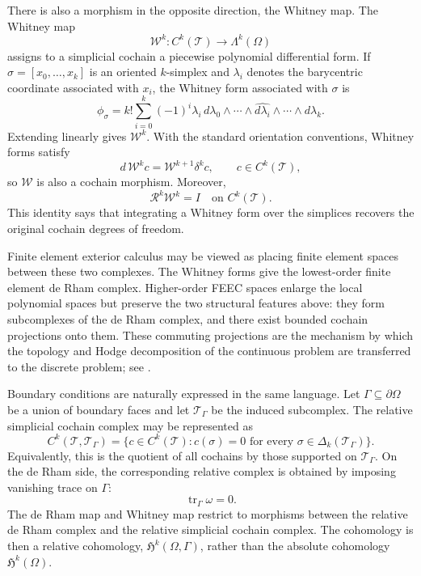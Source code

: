 \documentclass{article}
\newcommand{\f}[1]{\mathfrak{#1}}
\newcommand{\e}[1]{\mathcal{#1}}
\begin{document}
There is also a morphism in the opposite direction, the Whitney map.  The
Whitney map
\[
\e W^k:C^k(\e T)\longrightarrow \Lambda^k(\Omega)
\]
assigns to a simplicial cochain a piecewise polynomial differential form.  If
$\sigma=[x_0,\ldots,x_k]$ is an oriented $k$-simplex and
$\lambda_i$ denotes the barycentric coordinate associated with $x_i$, the
Whitney form associated with $\sigma$ is
\[
\phi_\sigma
	=
	k!
	\sum_{i=0}^k
	(-1)^i
	\lambda_i\,
	d\lambda_0\wedge\cdots
	\wedge \widehat{d\lambda_i}
	\wedge\cdots
	\wedge d\lambda_k.
\]
Extending linearly gives $\e W^k$.  With the standard orientation conventions,
Whitney forms satisfy
\[	d\,\e W^k c
	=
	\e W^{k+1}\delta^k c,
	\qquad
	c\in C^k(\e T),
\]
so $\e W$ is also a cochain morphism.  Moreover,
\[
\e R^k \e W^k = I
	\quad\text{on } C^k(\e T).
\]
This identity says that integrating a Whitney form over the simplices recovers
the original cochain degrees of freedom.

Finite element exterior calculus may be viewed as placing finite element spaces
between these two complexes.  The Whitney forms give the lowest-order finite
element de Rham complex.  Higher-order FEEC spaces enlarge the local polynomial
spaces but preserve the two structural features above: they form subcomplexes of
the de Rham complex, and there exist bounded cochain projections onto them.
These commuting projections are the mechanism by which the topology and Hodge
decomposition of the continuous problem are transferred to the discrete problem;
see \cite{arnold2010finite}.

Boundary conditions are naturally expressed in the same language.  Let
$\Gamma\subseteq \partial\Omega$ be a union of boundary faces and let
$\e T_\Gamma$ be the induced subcomplex.  The relative simplicial cochain
complex may be represented as
\[
C^k(\e T,\e T_\Gamma)
	=
	\{c\in C^k(\e T): c(\sigma)=0
	\text{ for every }\sigma\in\Delta_k(\e T_\Gamma)\}.
\]
Equivalently, this is the quotient of all cochains by those supported on
$\e T_\Gamma$.  On the de Rham side, the corresponding relative complex is
obtained by imposing vanishing trace on $\Gamma$:
\[	\operatorname{tr}_{\Gamma}\omega=0.
\]
The de Rham map and Whitney map restrict to morphisms between the relative
de Rham complex and the relative simplicial cochain complex.  The cohomology is
then a relative cohomology, $\f H^k(\Omega,\Gamma)$, rather than the absolute cohomology $\f H^k(\Omega)$.
\end{document}
